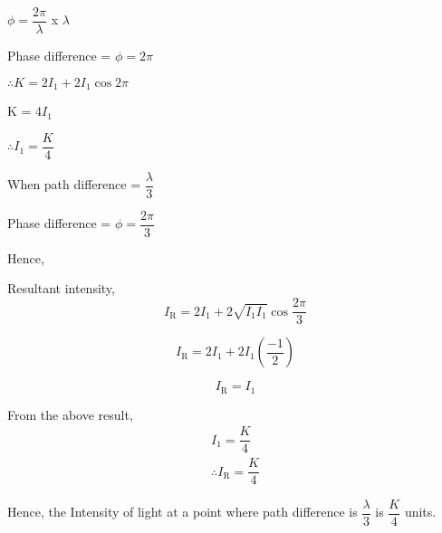\documentclass[journal,12pt,twocolumn]{IEEEtran}
\theoremstyle{remark}
\begin{document}
\hspace{1cm}$\phi = \dfrac{2\pi}{\lambda}$  x  $\lambda$

\vspace{0.2cm}

Phase difference = $\phi = 2\pi$

$\therefore K = 2I_1 +2I_1\cos{2\pi}$

\vspace{0.2cm}

        \hspace{0.2cm}    K = 4$I_1$

\vspace{0.2cm}

      \hspace{1cm}  $\therefore    I_1=\dfrac{K}{4}$

\vspace{1cm}

When path difference = $\dfrac{\lambda}{3}$

\vspace{0.3cm}

Phase difference = $ \phi = \dfrac{2\pi}{3} $

Hence,

\hspace*{0.5cm}Resultant intensity,
\[I_{\text{R}} = 2I_1 + 2\sqrt{I_1I_1}\cos{\dfrac{2\pi}{3}}\]

\[I_{\text{R}}= 2I_1 + 2I_1\left(\dfrac{-1}{2}\right)\]

\[I_{\text{R}} = I_1\]

From the above result,
\hspace*{0.5cm}
\begin{align*}
I_1 = \dfrac{K}{4}\\
\therefore I_{\text{R}} = \dfrac{K}{4}
\end{align*}

Hence, the Intensity of light at a point where path difference is $\dfrac{\lambda}{3}$ is $\dfrac{K}{4}$ units.


\end{document}
